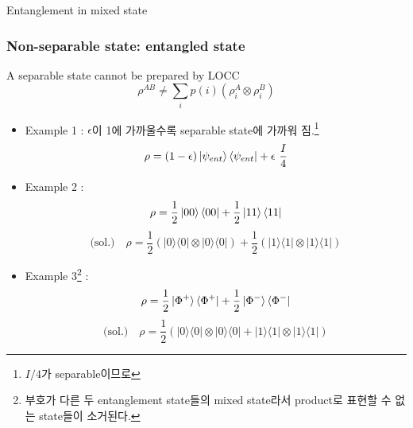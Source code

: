 \documentclass[9pt]{beamer}
\begin{document}
\begin{section}{Entanglement in mixed state}
        \begin{frame}
            \frametitle{Non-separable state: entangled state}
            \begin{definition}
                A separable state cannot be prepared by LOCC
                \begin{equation*}
                    \rho^{AB} \ne \sum_i p(i) \left( \rho_i^A \otimes \rho_i^B \right)
                \end{equation*}
                \vspace{-0.2cm}
            \end{definition}
            \begin{itemize}
                \item Example 1 : $\epsilon$이 1에 가까울수록 separable state에 가까워 짐.\footnote{$I/4$가 separable이므로}
                \begin{equation*}
                    \rho = (1-\epsilon) \ket{\psi_{ent}} \bra{\psi_{ent}} + \epsilon \  \frac{I}{4}
                \end{equation*}
                \item Example 2 :
                \begin{equation*}
                    \rho = \frac{1}{2} \ket{00} \bra{00} +  \frac{1}{2} \ket{11} \bra{11}
                \end{equation*}
                \begin{equation*}
                    \text{(sol.)}\quad  \rho=\frac{1}{2}(|0\rangle\langle 0| \otimes|0\rangle\langle 0|)+\frac{1}{2}(|1\rangle\langle 1| \otimes|1\rangle\langle 1|)
                \end{equation*}
                \item Example 3\footnote{부호가 다른 두 entanglement state들의 mixed state라서 product로 표현할 수 없는 state들이 소거된다.} : 
                \begin{equation*}
                    \rho = \frac{1}{2} \ket{\Phi^+} \bra{\Phi^+} +  \frac{1}{2} \ket{\Phi^-} \bra{\Phi^-}
                \end{equation*}
                \begin{equation*}
                    \text{(sol.)}\quad  \rho=\frac{1}{2}(|0\rangle\langle 0| \otimes|0\rangle\langle 0| + |1\rangle\langle 1| \otimes|1\rangle\langle 1|)
                \end{equation*}
            \end{itemize}
            

\end{frame}
\end{section}
\end{document}
